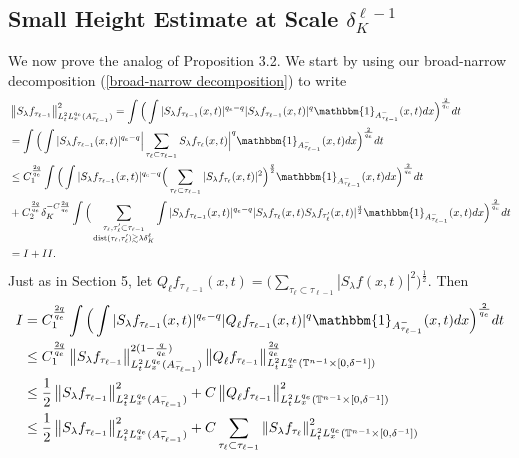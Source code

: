 \documentclass[11pt]{amsart}
\numberwithin{equation}{section}
\newcommand{\Tn}{\mathbb{T}^{n-1}}
\newcommand{\la}{\lambda}
\newcommand\norm[1]{\left\lVert#1\right\rVert}
\newcommand{\mixlpnorm}[4]{\norm{#1}_{L^{#2}_{t} L^{#3}_{x}(#4)}}
\newcommand{\Sl}{S_{\la}}
\newcommand{\dK}[1]{\delta_{K}^{#1}}
\newcommand{\Sq}[3]{Q_{#3}^{#2}#1}
\begin{document}
\subsection{Small Height Estimate at Scale $\dK{\ell-1}$}
We now prove the analog of Proposition 3.2. We start by using our broad-narrow decomposition (\ref{broad-narrow decomposition}) to write
\begin{equation}
\begin{split}
    &\mixlpnorm{\Sl f_{\tau_{\ell - 1}}}{2}{q_e}{A^{-}_{\tau_{\ell - 1}}}^2 = \int\Big(\int |\Sl f_{\tau_{\ell - 1}}(x,t)|^{q_e - q}|\Sl f_{\tau_{\ell - 1}}(x,t)|^{q}\mathbbm{1}_{A_{\tau_{\ell - 1}}^{-}}(x,t)dx\Big)^{\frac{2}{q_e}}dt \\
    &=  \int\Big(\int |\Sl f_{\tau_{\ell - 1}}(x,t)|^{q_e - q}\Big|\sum_{\tau_{\ell} \subset \tau_{\ell - 1}}\Sl f_{\tau_{\ell}}(x,t)\Big|^{q}\mathbbm{1}_{A_{\tau_{\ell - 1}}^{-}}(x,t)dx\Big)^{\frac{2}{q_e}}dt \\ 
    &\leq C_1^{\frac{2q}{q_e}}\int \Big(\int|\Sl f_{\tau_{\ell - 1}}(x,t)|^{q_e - q}\Big(\sum_{\tau_{\ell} \subset \tau_{\ell - 1}}|\Sl f_{\tau_{\ell}}(x,t)|^{2}\Big)^{\frac{q}{2}}\mathbbm{1}_{A_{\tau_{\ell - 1}}^{-}}(x,t)dx\Big)^{\frac{2}{q_e}}dt \\
    &+ C_2^{\frac{2q}{q_e}}\dK{-C\frac{2q}{q_e}} \int\Big( \sum_{\substack{\tau_{\ell}, \tau_{\ell}' \subset \tau_{\ell - 1} \\ \text{dist}(\tau_{\ell} , \tau_{\ell}') \gtrsim \la\dK{\ell}}}\int |\Sl f_{\tau_{\ell - 1}}(x,t)|^{q_e - q}  |\Sl f_{\tau_{\ell}}(x,t)\Sl f_{\tau_{\ell}'}(x,t)|^{\frac{q}{2}}\mathbbm{1}_{A_{\tau_{\ell - 1}}^{-}}(x,t)dx\Big)^{\frac{2}{q_e}}dt \\ 
    & = I + II.
\end{split}
\end{equation}
Just as in Section 5, let $Q_{\ell}f_{\tau_{\ell - 1}}(x,t) = \big( \sum_{\tau_{\ell} \subset \tau_{\ell - 1}}|\Sl f(x,t)|^2\big)^{\frac{1}{2}}$. Then
\begin{equation} \label{narrow term endpoint estimate}
\begin{split}
    I &= C_1^{\frac{2q}{q_e}}\int \Big(\int|\Sl f_{\tau_{\ell - 1}}(x,t)|^{q_e - q}|\Sq{f_{\tau_{\ell - 1}}}{}{\ell}(x,t)|^{q}\mathbbm{1}_{A_{\tau_{\ell - 1}}^{-}}(x,t)dx\Big)^{\frac{2}{q_e}}dt \\
    &\leq C_1^{\frac{2q}{q_e}}\mixlpnorm{\Sl f_{\tau_{\ell - 1}}}{2}{q_e}{A_{\tau_{\ell - 1}}^{-}}^{2(1 - \frac{q}{q_e})} \mixlpnorm{\Sq{f_{\tau_{\ell - 1}}}{}{\ell}}{2}{q_e}{\Tn \times [0, \delta^{-1}]}^{\frac{2q}{q_e}} \\
    &\leq \frac{1}{2}\mixlpnorm{\Sl f_{\tau_{\ell - 1}}}{2}{q_e}{A_{\tau_{\ell - 1}}^{-}}^{2} + C\mixlpnorm{\Sq{f_{\tau_{\ell - 1}}}{}{\ell}}{2}{q_e}{\Tn \times [0, \delta^{-1}]}^{2} \\
    &\leq \frac{1}{2}\mixlpnorm{\Sl f_{\tau_{\ell - 1}}}{2}{q_e}{A_{\tau_{\ell - 1}}^{-}}^{2} + C\sum_{\tau_{\ell} \subset \tau_{\ell - 1}} \mixlpnorm{\Sl f_{\tau_{\ell}}}{2}{q_e}{\Tn \times [0, \delta^{-1}]}^2
\end{split} 
\end{equation}
\end{document}
